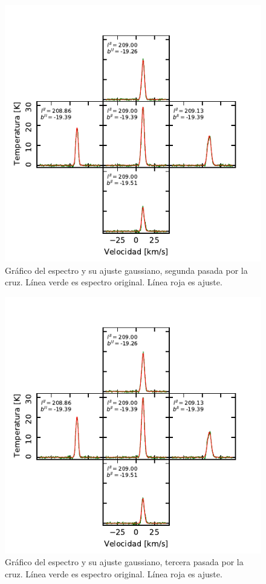 \begin{figure}[p]
	\centering
	\includegraphics{rsc/specfit2.pdf}
	\caption{Gráfico del espectro y su ajuste gaussiano, segunda pasada por la cruz. Línea verde es espectro original. Línea roja es ajuste.}
	\label{fig:specfit2}
\end{figure}

\begin{figure}[p]
	\centering
	\includegraphics{rsc/specfit3.pdf}
	\caption{Gráfico del espectro y su ajuste gaussiano, tercera pasada por la cruz. Línea verde es espectro original. Línea roja es ajuste.}
	\label{fig:specfit3}
\end{figure}

